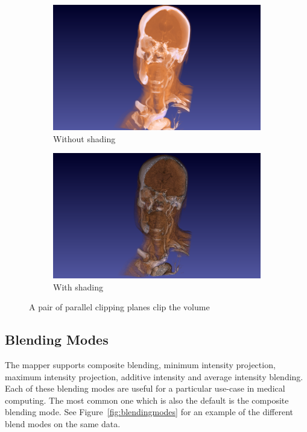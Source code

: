 \begin{figure}[ht]
  \centering
  \begin{subfigure}[b]{.5\columnwidth}
    \includegraphics[width=\textwidth]{HeadClippingSlabNoShading.png}
    \caption{Without shading}
    \label{fig:clipnoshading}
  \end{subfigure}%
  \begin{subfigure}[b]{.5\columnwidth}
    \includegraphics[width=\textwidth]{HeadClippingSlabShading.png}
    \caption{With shading}
    \label{fig:clipshading}
  \end{subfigure}%
  \caption{A pair of parallel clipping planes clip the volume}
  \label{fig:clipping}
\end{figure}

\subsection{Blending Modes}
The mapper supports composite blending, minimum intensity projection, maximum
intensity projection, additive intensity and average intensity blending. Each of
these blending modes are useful for a particular use-case in medical computing.
The most common one which is also the default is the composite blending mode.
See Figure~\ref{fig:blendingmodes} for an example of the different blend modes
on the same data.

